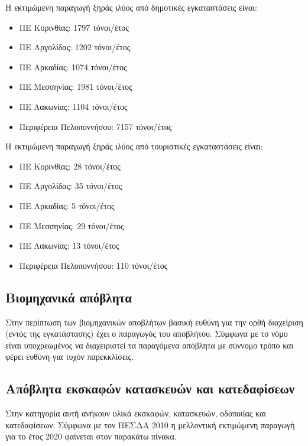 \documentclass[12pt]{article}
\begin{document}
	Η εκτιμώμενη παραγωγή ξηράς ιλύος από δημοτικές εγκαταστάσεις είναι:
	
	\begin{itemize}
		\item ΠΕ Κορινθίας: 1797 τόνοι/έτος
		\item ΠΕ Αργολίδας: 1202 τόνοι/έτος
		\item ΠΕ Αρκαδίας: 1074 τόνοι/έτος
		\item ΠΕ Μεσσηνίας: 1981 τόνοι/έτος
		\item ΠΕ Λακωνίας: 1104 τόνοι/έτος
		\item Περιφέρεια Πελοποννήσου: 7157 τόνοι/έτος
	\end{itemize}
	Η εκτιμώμενη παραγωγή ξηράς ιλύος από τουριστικές εγκαταστάσεις είναι:
	\begin{itemize}
		\item ΠΕ Κορινθίας: 28 τόνοι/έτος
		\item ΠΕ Αργολίδας: 35 τόνοι/έτος
		\item ΠΕ Αρκαδίας: 5 τόνοι/έτος
		\item ΠΕ Μεσσηνίας: 29 τόνοι/έτος
		\item ΠΕ Λακωνίας: 13 τόνοι/έτος
		\item Περιφέρεια Πελοποννήσου: 110 τόνοι/έτος
	\end{itemize}

	\subsection{Βιομηχανικά απόβλητα}
	
	Στην περίπτωση των βιομηχανικών αποβλήτων βασική ευθύνη για την ορθή διαχείριση (εντός της εγκατάστασης) έχει ο παραγωγός του αποβλήτου. Σύμφωνα με το νόμο είναι υποχρεωμένος να διαχειριστεί τα παραγόμενα απόβλητα με σύννομο τρόπο και φέρει ευθύνη για τυχόν παρεκκλίσεις.
	
	\subsection{Απόβλητα εκσκαφών κατασκευών και κατεδαφίσεων}
	
	Στην κατηγορία αυτή ανήκουν υλικά εκσκαφών, κατασκευών, οδοποιίας και κατεδαφίσεων. Σύμφωνα με τον ΠΕΣΔΑ 2010 η μελλοντική εκτιμώμενη παραγωγή για το έτος 2020 φαίνεται στον παρακάτω πίνακα.
	
\end{document}
